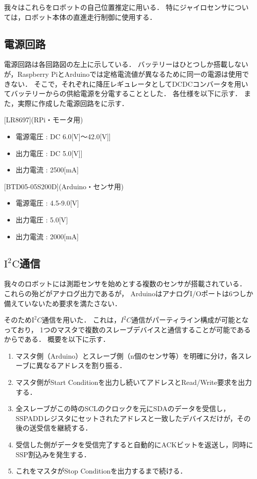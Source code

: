 \documentclass[11pt,a4]{jsarticle}
\begin{document}
      我々はこれらをロボットの自己位置推定に用いる．
      特にジャイロセンサについては，ロボット本体の直進走行制御に使用する．


  \subsection{電源回路}
    電源回路は各回路図の左上に示している．
    バッテリーはひとつしか搭載しないが，Raspberry PiとArduinoでは定格電流値が異なるために同一の電源は使用できない．
    そこで，それぞれに降圧レギュレータとしてDCDCコンバータを用いてバッテリーからの供給電源を分電することとした．
    各仕様を以下に示す．
    また，実際に作成した電源回路をに示す．

    [LR8697](RPi・モータ用)
    \begin{itemize}
     \item 電源電圧 : DC 6.0[V]$〜$42.0[V]]
     \item 出力電圧 : DC 5.0[V]]
     \item 出力電流 : 2500[mA]
    \end{itemize}

    [BTD05-05S200D](Arduino・センサ用)
    \begin{itemize}
     \item 電源電圧 : 4.5-9.0[V]
     \item 出力電圧 : 5.0[V]
     \item 出力電流 : 2000[mA]
    \end{itemize}


  \subsection{$\mathrm{I^2C}$通信}
    我々のロボットには測距センサを始めとする複数のセンサが搭載されている．
    これらの殆どがアナログ出力であるが，
    ArduinoはアナログI/Oポートは6つしか備えていないため要求を満たさない．

    そのため$\mathrm{I^2}C$通信を用いた．
    これは，$I^2 C$通信がパーティライン構成が可能となっており，
    1つのマスタで複数のスレーブデバイスと通信することが可能であるからである．
    概要を以下に示す．
    \begin{enumerate}
      \item マスタ側（Arduino）とスレーブ側（n個のセンサ等）を明確に分け，各スレーブに異なるアドレスを割り振る．
      \item マスタ側がStart Conditionを出力し続いてアドレスとRead/Write要求を出力する．
      \item 全スレーブがこの時のSCLのクロックを元にSDAのデータを受信し，SSPADDレジスタにセットされたアドレスと一致したデバイスだけが，その後の送受信を継続する．
      \item 受信した側がデータを受信完了すると自動的にACKビットを返送し，同時にSSP割込みを発生する．
      \item これをマスタがStop Conditionを出力するまで続ける．
    \end{enumerate}
\end{document}
